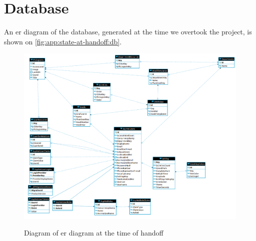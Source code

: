 \section{Database}\label{app:state-at-handoff:db}

An \gls{er} diagram of the database, generated at the time we overtook the project, is shown on \autoref{fig:app:state-at-handoff:db}.

\begin{figure}[h]
    \centering
    \caption{Diagram of \gls{er} diagram at the time of handoff}
    \includegraphics[width=1\textwidth]{figures/db_ho.png}
    \label{fig:app:state-at-handoff:db}
\end{figure}
